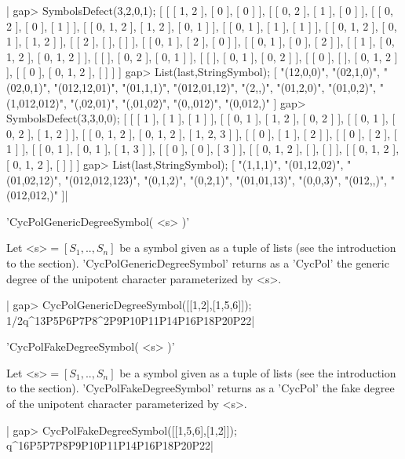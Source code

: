 |    gap> SymbolsDefect(3,2,0,1);
    [ [ [ 1, 2 ], [ 0 ], [ 0 ] ], [ [ 0, 2 ], [ 1 ], [ 0 ] ],
      [ [ 0, 2 ], [ 0 ], [ 1 ] ], [ [ 0, 1, 2 ], [ 1, 2 ], [ 0, 1 ] ],
      [ [ 0, 1 ], [ 1 ], [ 1 ] ], [ [ 0, 1, 2 ], [ 0, 1 ], [ 1, 2 ] ],
      [ [ 2 ], [  ], [  ] ], [ [ 0, 1 ], [ 2 ], [ 0 ] ],
      [ [ 0, 1 ], [ 0 ], [ 2 ] ], [ [ 1 ], [ 0, 1, 2 ], [ 0, 1, 2 ] ],
      [ [  ], [ 0, 2 ], [ 0, 1 ] ], [ [  ], [ 0, 1 ], [ 0, 2 ] ],
      [ [ 0 ], [  ], [ 0, 1, 2 ] ], [ [ 0 ], [ 0, 1, 2 ], [  ] ] ]
    gap> List(last,StringSymbol);
    [ "(12,0,0)", "(02,1,0)", "(02,0,1)", "(012,12,01)", "(01,1,1)",
      "(012,01,12)", "(2,,)", "(01,2,0)", "(01,0,2)", "(1,012,012)",
      "(,02,01)", "(,01,02)", "(0,,012)", "(0,012,)" ]
    gap> SymbolsDefect(3,3,0,0);
    [ [ [ 1 ], [ 1 ], [ 1 ] ], [ [ 0, 1 ], [ 1, 2 ], [ 0, 2 ] ],
      [ [ 0, 1 ], [ 0, 2 ], [ 1, 2 ] ],
      [ [ 0, 1, 2 ], [ 0, 1, 2 ], [ 1, 2, 3 ] ], [ [ 0 ], [ 1 ], [ 2 ] ],
      [ [ 0 ], [ 2 ], [ 1 ] ], [ [ 0, 1 ], [ 0, 1 ], [ 1, 3 ] ],
      [ [ 0 ], [ 0 ], [ 3 ] ], [ [ 0, 1, 2 ], [  ], [  ] ],
      [ [ 0, 1, 2 ], [ 0, 1, 2 ], [  ] ] ]
    gap> List(last,StringSymbol);
    [ "(1,1,1)", "(01,12,02)", "(01,02,12)", "(012,012,123)", "(0,1,2)",
      "(0,2,1)", "(01,01,13)", "(0,0,3)", "(012,,)", "(012,012,)" ]|

%
%

'CycPolGenericDegreeSymbol( <s> )'

Let <s>$=[S_1,..,S_n]$  be a symbol given  as a tuple of  lists (see the
introduction to  the section). 'CycPolGenericDegreeSymbol' returns  as a
'CycPol' the generic degree of  the unipotent character parameterized by
<s>.

|    gap> CycPolGenericDegreeSymbol([[1,2],[1,5,6]]);
    1/2q^13P5P6P7P8^2P9P10P11P14P16P18P20P22|

%
%

'CycPolFakeDegreeSymbol( <s> )'

Let <s>$=[S_1,..,S_n]$  be a symbol given  as a tuple of  lists (see the
introduction  to the  section).  'CycPolFakeDegreeSymbol'  returns as  a
'CycPol' the  fake degree  of the  unipotent character  parameterized by
<s>.

|    gap> CycPolFakeDegreeSymbol([[1,5,6],[1,2]]);
    q^16P5P7P8P9P10P11P14P16P18P20P22|

